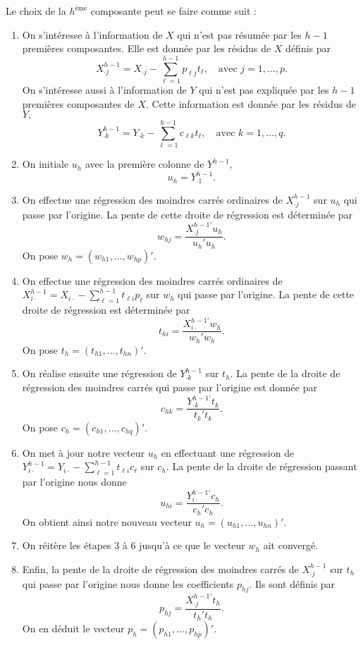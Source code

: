 Le choix de la $h^{\text{ème}}$ composante peut se faire comme suit :
\begin{enumerate}
 \item On s'intéresse à l'information de $X$ qui n'est pas résumée par les $h-1$ premières composantes. 
 Elle est donnée par les résidus de $X$ définis par
 \[
 X^{h-1}_{\cdot j} = X_{\cdot j} - \sum_{\ell=1}^{h-1} p_{\ell j}t_{\ell},  \quad \text{avec } j = 1,\ldots, p.
 \]
 On s'intéresse aussi à l'information de $Y$ qui n'est pas expliquée par les $h-1$ premières composantes de $X$. 
 Cette information est donnée par les résidus de $Y,$
 \[
 Y^{h-1}_{\cdot k} = Y_{\cdot k} - \sum_{\ell=1}^{h-1} c_{\ell k}t_{\ell},  \quad \text{avec } k = 1,\ldots, q.
 \] 
 \item On initiale $u_h$ avec la première colonne de $Y^{h-1}$,
 \[
 u_h = Y^{h-1}_{\cdot 1}.
 \]
 \item On effectue une régression des moindres carrés ordinaires de $X^{h-1}_{\cdot j}$ sur $u_h$ qui passe par l'origine. 
 La pente de cette droite de régression est déterminée par
 \[
 w_{hj} = \frac{X^{h-1'}_{\cdot j} u_h}{u_h'u_h}.
 \]
 On pose $w_h = (w_{h1}, \ldots, w_{hp})'$.
 \item On effectue une régression des moindres carrés ordinaires de $X^{h-1}_{i \cdot} = X_{i\cdot} - \sum_{\ell=1}^{h-1}t_{\ell i}p_{\ell}$ sur $w_h$ qui passe par l'origine. 
 La pente de cette droite de régression est déterminée par
 \[
 t_{hi} = \frac{X^{h-1'}_{i\cdot} w_h}{w_h'w_h}.
 \]
 On pose $t_h = (t_{h1}, \ldots, t_{hn})'$.
 \item On réalise ensuite une régression de $Y^{h-1}_{\cdot k}$ sur $t_h$.
 La pente de la droite de régression des moindres carrés qui passe par l'origine est donnée par
 \[
 c_{hk} = \frac{Y^{h-1'}_{\cdot k} t_k}{t_k't_k}.
 \]
 On pose $c_h = (c_{h1}, \ldots, c_{hq})'$.
 \item On met à jour notre vecteur $u_h$ en effectuant une régression de $Y^{h-1}_{i \cdot} = Y_{i\cdot} - \sum_{\ell=1}^{h-1}t_{\ell i}c_{\ell}$ sur $c_h$.
 La pente de la droite de régression passant par l'origine nous donne 
 \[
 u_{hi} = \frac{Y^{h-1'}_{i \cdot} c_h}{c_h'c_h}.
 \]
 On obtient ainsi notre nouveau vecteur $u_h = (u_{h1}, \ldots, u_{hn})'$.
 \item On réitère les étapes 3 à 6 jusqu'à ce que le vecteur $w_h$ ait convergé.
 \item Enfin, la pente de la droite de régression des moindres carrés de $X^{h-1}_{\cdot j}$ sur $t_h$ qui passe par l'origine nous donne les coefficients $p_{hj}$.
 Ils sont définis par
 \[
 p_{hj} = \frac{X^{h-1'}_{\cdot j} t_h}{t_h't_h}.
 \]
 On en déduit le vecteur $p_h = (p_{h1}, \ldots, p_{hp})'.$
 \end{enumerate}

